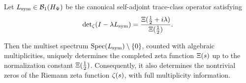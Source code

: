 \begin{corollary}
\label{cor:spectrum_determines_zeta}
Let \( L_{\mathrm{sym}} \in \mathcal{B}_1(H_{\Psi}) \) be the canonical self-adjoint trace-class operator satisfying
\[
\det\nolimits_\zeta(I - \lambda L_{\mathrm{sym}}) = \frac{\Xi(\tfrac{1}{2} + i\lambda)}{\Xi(\tfrac{1}{2})}.
\]

Then the multiset spectrum \( \operatorname{Spec}(L_{\mathrm{sym}}) \setminus \{0\} \), counted with algebraic multiplicities, uniquely determines the completed zeta function \( \Xi(s) \) up to the normalization constant \( \Xi(\tfrac{1}{2}) \). Consequently, it also determines the nontrivial zeros of the Riemann zeta function \( \zeta(s) \), with full multiplicity information.
\end{corollary}
